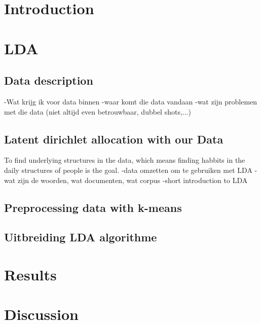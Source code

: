 \documentclass[11pt,a4paper]{report}
\begin{document}
\section{Introduction}



\section{LDA}
\subsection{Data description}
-Wat krijg ik voor data binnen
-waar komt die data vandaan
-wat zijn problemen met die data (niet altijd even betrouwbaar, dubbel shots,...)


\subsection{Latent dirichlet allocation with our Data}
To find underlying structures in the data, which means finding habbits in the daily structures of people is the goal.
-data omzetten om te gebruiken met LDA
-wat zijn de woorden, wat documenten, wat corpus
-short introduction to LDA

\subsection{Preprocessing data with k-means}


\subsection{Uitbreiding LDA algorithme}


\section{Results}


\section{Discussion}
\end{document}
